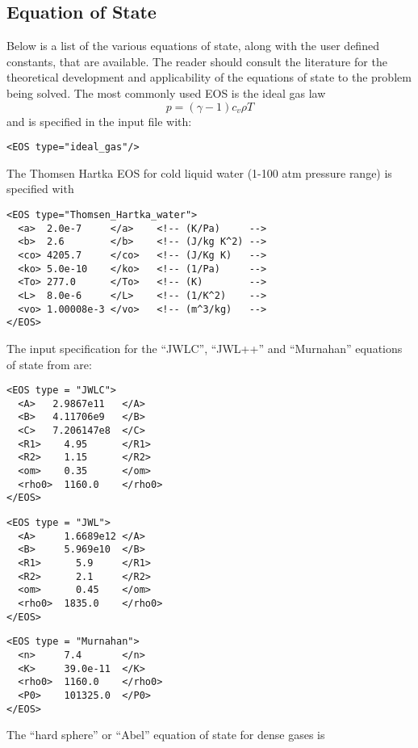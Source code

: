 \subsection{Equation of State}
Below is a list of the various equations of state, along with the user defined
constants, that are available.  The reader should consult the literature for
the theoretical development and applicability of the equations of state to
the problem being solved.
%
%
The most commonly used EOS is the ideal gas law
\begin{equation}
  p = (\gamma -1) c_v \rho T
\end{equation}
%
and is specified in the input file with:
%
\begin{Verbatim}[fontsize=\footnotesize]
<EOS type="ideal_gas"/>
\end{Verbatim}
%
The Thomsen Hartka EOS for cold liquid water (1-100 atm pressure range)
is specified with \cite{ref:Thomsen,ref:bejan}
%
\begin{Verbatim}[fontsize=\footnotesize]
<EOS type="Thomsen_Hartka_water">
  <a>  2.0e-7     </a>    <!-- (K/Pa)     -->    
  <b>  2.6        </b>    <!-- (J/kg K^2) -->
  <co> 4205.7     </co>   <!-- (J/Kg K)   -->
  <ko> 5.0e-10    </ko>   <!-- (1/Pa)     -->
  <To> 277.0      </To>   <!-- (K)        -->
  <L>  8.0e-6     </L>    <!-- (1/K^2)    -->
  <vo> 1.00008e-3 </vo>   <!-- (m^3/kg)   -->
</EOS>
\end{Verbatim}
% 
%
The input specification for the ``JWLC'', ``JWL++'' and ``Murnahan'' equations of state from \cite{ref:JWL} are: 
\begin{Verbatim}[fontsize=\footnotesize]
<EOS type = "JWLC">
  <A>   2.9867e11   </A>
  <B>   4.11706e9   </B>
  <C>   7.206147e8  </C>
  <R1>    4.95      </R1>
  <R2>    1.15      </R2>
  <om>    0.35      </om>
  <rho0>  1160.0    </rho0>
</EOS>
\end{Verbatim}
%
\begin{Verbatim}[fontsize=\footnotesize]
<EOS type = "JWL">
  <A>     1.6689e12 </A>
  <B>     5.969e10  </B>
  <R1>      5.9     </R1>
  <R2>      2.1     </R2>
  <om>      0.45    </om>
  <rho0>  1835.0    </rho0>
</EOS>
\end{Verbatim}
%
\begin{Verbatim}[fontsize=\footnotesize]
<EOS type = "Murnahan">
  <n>     7.4       </n>
  <K>     39.0e-11  </K>
  <rho0>  1160.0    </rho0>
  <P0>    101325.0  </P0>
</EOS>
\end{Verbatim}
%
The ``hard sphere'' or ``Abel'' equation of state for dense gases is
%
